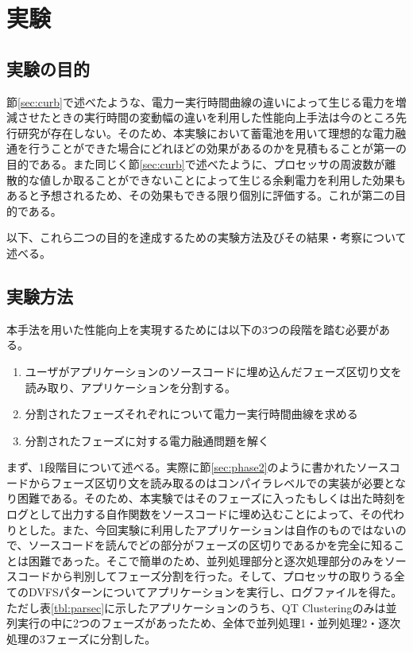 \chapter{実験}
\label{chap:experiment}


\section{実験の目的}
\label{sec:purpose}

節\ref{sec:curb}で述べたような、電力ー実行時間曲線の違いによって生じる電力を増減させたときの実行時間の変動幅の違いを利用した性能向上手法は今のところ先行研究が存在しない。そのため、本実験において蓄電池を用いて理想的な電力融通を行うことができた場合にどれほどの効果があるのかを見積もることが第一の目的である。また同じく節\ref{sec:curb}で述べたように、プロセッサの周波数が離散的な値しか取ることができないことによって生じる余剰電力を利用した効果もあると予想されるため、その効果もできる限り個別に評価する。これが第二の目的である。

以下、これら二つの目的を達成するための実験方法及びその結果・考察について述べる。


\section{実験方法}
\label{sec:method}

本手法を用いた性能向上を実現するためには以下の3つの段階を踏む必要がある。

\begin{enumerate}
\item ユーザがアプリケーションのソースコードに埋め込んだフェーズ区切り文を読み取り、アプリケーションを分割する。
\item 分割されたフェーズそれぞれについて電力ー実行時間曲線を求める
\item 分割されたフェーズに対する電力融通問題を解く
\end{enumerate}

まず、1段階目について述べる。実際に節\ref{sec:phase2}のように書かれたソースコードからフェーズ区切り文を読み取るのはコンパイラレベルでの実装が必要となり困難である。そのため、本実験ではそのフェーズに入ったもしくは出た時刻をログとして出力する自作関数をソースコードに埋め込むことによって、その代わりとした。また、今回実験に利用したアプリケーションは自作のものではないので、ソースコードを読んでどの部分がフェーズの区切りであるかを完全に知ることは困難であった。そこで簡単のため、並列処理部分と逐次処理部分のみをソースコードから判別してフェーズ分割を行った。そして、プロセッサの取りうる全てのDVFSパターンについてアプリケーションを実行し、ログファイルを得た。ただし表\ref{tbl:parsec}に示したアプリケーションのうち、QT Clusteringのみは並列実行の中に2つのフェーズがあったため、全体で並列処理1・並列処理2・逐次処理の3フェーズに分割した。

